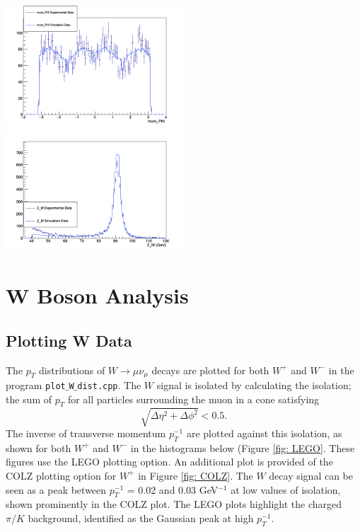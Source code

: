 \documentclass[a4paper]{article}
\begin{document}
\includegraphics[clip, trim = 0.5cm 0cm 1.7cm 1.3cm, width=0.5\textwidth]{Measurement_mum_PHI.png}
\includegraphics[clip, trim = 0.5cm 0cm 1.7cm 1.3cm, width=0.5\textwidth]{Measurement_Z_M.png}

\section{W Boson Analysis} \label{sec: W boson}

\subsection{Plotting W Data} \label{sec: W plotting}

The $p_T$ distributions of $W \xrightarrow{} \mu \nu_\mu$ decays are plotted for both $W^+$ and $W^-$ in the program \texttt{plot$\_$W$\_$dist.cpp}. 
The $W$ signal is isolated by calculating the isolation; the sum of $p_T$ for all particles surrounding the muon in a cone satisfying
\begin{equation}
    \sqrt{\Delta\eta^2 + \Delta\phi^2} < 0.5.
    \label{eq: isolation}
\end{equation}
The inverse of transverse momentum $p_T^{-1}$ are plotted against this isolation, as shown for both $W^+$ and $W^-$ in the histograms below (Figure \ref{fig: LEGO}. These figures use the LEGO plotting option. An additional plot is provided of the COLZ plotting option for $W^+$ in Figure \ref{fig: COLZ}. 
The $W$ decay signal can be seen as a peak between $p_T^{-1}$ = 0.02 and 0.03 GeV$^{-1}$ at low values of isolation, shown prominently in the COLZ plot. The LEGO plots highlight the charged $\pi/K$ background, identified as the Gaussian peak at high $p_T^{-1}$.
\end{document}
